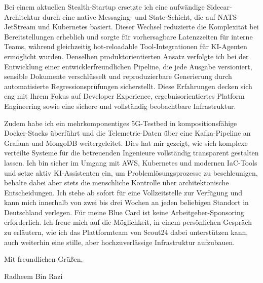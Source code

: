 \documentclass[11pt,a4paper]{coverletter}
\begin{document}
Bei einem aktuellen Stealth-Startup ersetzte ich eine aufwändige Sidecar-Architektur durch eine native Messaging- und State-Schicht, die auf NATS JetStream und Kubernetes basiert. Dieser Wechsel reduzierte die Komplexität bei Bereitstellungen erheblich und sorgte für vorhersagbare Latenzzeiten für interne Teams, während gleichzeitig hot-reloadable Tool-Integrationen für KI-Agenten ermöglicht wurden. Denselben produktorientierten Ansatz verfolgte ich bei der Entwicklung einer entwicklerfreundlichen Pipeline, die jede Ausgabe versioniert, sensible Dokumente verschlüsselt und reproduzierbare Generierung durch automatisierte Regressionsprüfungen sicherstellt. Diese Erfahrungen decken sich eng mit Ihrem Fokus auf Developer Experience, ergebnisorientiertes Platform Engineering sowie eine sichere und vollständig beobachtbare Infrastruktur.

Zudem habe ich ein mehrkomponentiges 5G-Testbed in kompositionsfähige Docker-Stacks überführt und die Telemetrie-Daten über eine Kafka-Pipeline an Grafana und MongoDB weitergeleitet. Dies hat mir gezeigt, wie sich komplexe verteilte Systeme für die betreuenden Ingenieure vollständig transparent gestalten lassen. Ich bin sicher im Umgang mit AWS, Kubernetes und modernen IaC-Tools und setze aktiv KI-Assistenten ein, um Problemlösungsprozesse zu beschleunigen, behalte dabei aber stets die menschliche Kontrolle über architektonische Entscheidungen. Ich stehe ab sofort für eine Vollzeitstelle zur Verfügung und kann mich innerhalb von zwei bis drei Wochen an jeden beliebigen Standort in Deutschland verlegen. Für meine Blue Card ist keine Arbeitgeber-Sponsoring erforderlich. Ich freue mich auf die Möglichkeit, in einem persönlichen Gespräch zu erläutern, wie ich das Plattformteam von Scout24 dabei unterstützen kann, auch weiterhin eine stille, aber hochzuverlässige Infrastruktur aufzubauen.

\closing{Mit freundlichen Grüßen,}{Radheem Bin Razi}
\end{document}
